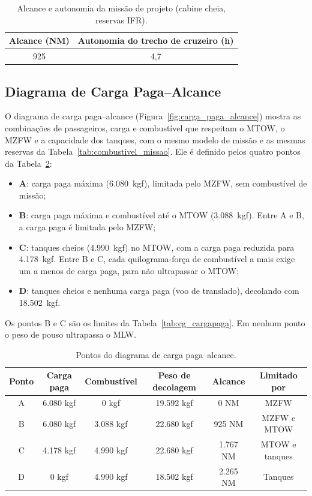 \begin{table}[H]
\centering
\caption{Alcance e autonomia da missão de projeto (cabine cheia, reservas IFR).}
\begin{tabular}{cc}
\hline
Alcance (NM) & Autonomia do trecho de cruzeiro (h) \\
\hline
925 & 4,7 \\
\hline
\end{tabular}
\label{tab:autonomia_alcance_cruzeiro}
\end{table}

\subsection{Diagrama de Carga Paga--Alcance}
\label{sec:carga_paga_alcance}

O diagrama de carga paga--alcance (Figura~\ref{fig:carga_paga_alcance}) mostra as combinações de passageiros, carga e combustível que respeitam o MTOW, o MZFW e a capacidade dos tanques, com o mesmo modelo de missão e as mesmas reservas da Tabela~\ref{tab:combustivel_missao}. Ele é definido pelos quatro pontos da Tabela~\ref{tab:pontos_carga_paga}:

\begin{itemize}
    \item \textbf{A}: carga paga máxima (6.080~kgf), limitada pelo MZFW, sem combustível de missão;
    \item \textbf{B}: carga paga máxima e combustível até o MTOW (3.088~kgf). Entre A e B, a carga paga é limitada pelo MZFW;
    \item \textbf{C}: tanques cheios (4.990~kgf) no MTOW, com a carga paga reduzida para 4.178~kgf. Entre B e C, cada quilograma-força de combustível a mais exige um a menos de carga paga, para não ultrapassar o MTOW;
    \item \textbf{D}: tanques cheios e nenhuma carga paga (voo de translado), decolando com 18.502~kgf.
\end{itemize}

Os pontos B e C são os limites da Tabela~\ref{tab:cg_cargapaga}. Em nenhum ponto o peso de pouso ultrapassa o MLW.

\begin{table}[H]
    \centering
    \caption{Pontos do diagrama de carga paga--alcance.}
    \label{tab:pontos_carga_paga}
    \small
    \begin{tabular}{cccccc}
        \toprule
        \textbf{Ponto} & \textbf{Carga paga} & \textbf{Combustível} & \textbf{Peso de decolagem} & \textbf{Alcance} & \textbf{Limitado por} \\
        \midrule
        A & 6.080 kgf & 0 kgf & 19.592 kgf & 0 NM    & MZFW \\
        B & 6.080 kgf & 3.088 kgf & 22.680 kgf & 925 NM  & MZFW e MTOW \\
        C & 4.178 kgf & 4.990 kgf & 22.680 kgf & 1.767 NM & MTOW e tanques \\
        D & 0 kgf & 4.990 kgf & 18.502 kgf & 2.265 NM & Tanques \\
        \bottomrule
    \end{tabular}
\end{table}

